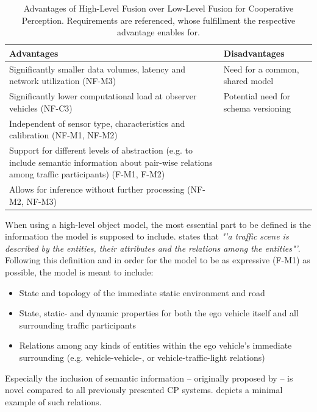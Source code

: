 \begin{table}[H]
	\centering
	\begin{tabular}{|p{7.5cm}|p{7.5cm}|}
		\hline
		\textbf{Advantages} & \textbf{Disadvantages} \\ \hline
		Significantly smaller data volumes, latency and network utilization (NF-M3) & Need for a common, shared model \\ \hline
		Significantly lower computational load at observer vehicles (NF-C3) & Potential need for schema versioning \\ \hline
		Independent of sensor type, characteristics and calibration (NF-M1, NF-M2) & \multirow{3}{*}{} \\ \cline{1-1}
		Support for different levels of abstraction (e.g. to include semantic information about pair-wise relations among traffic participants) (F-M1, F-M2) &  \\ \cline{1-1}
		Allows for inference without further processing (NF-M2, NF-M3) &  \\ \hline
	\end{tabular}
	\caption[Comparison High-/Low Level Fusion]{Advantages of High-Level Fusion over Low-Level Fusion for Cooperative Perception. Requirements are referenced, whose fulfillment the respective advantage enables for.}
	\label{tab:comparison_fusion}
\end{table}

When using a high-level object model, the most essential part to be defined is the information the model is supposed to include. \cite{Petrich2018} states that \textit{"'a traffic scene is described by the entities, their attributes and the relations among the entities"'}. Following this definition and in order for the model to be as expressive (F-M1) as possible, the model is meant to include:

\begin{itemize}
	\item State and topology of the immediate static environment and road
	\item State, static- and dynamic properties for both the ego vehicle itself and all surrounding traffic participants
	\item Relations among any kinds of entities within the ego vehicle's immediate surrounding (e.g. vehicle-vehicle-, or vehicle-traffic-light relations)
\end{itemize}

Especially the inclusion of semantic information – originally proposed by \cite{Kohlhaas2014} – is novel compared to all previously presented CP systems.  depicts a minimal example of such relations. 


